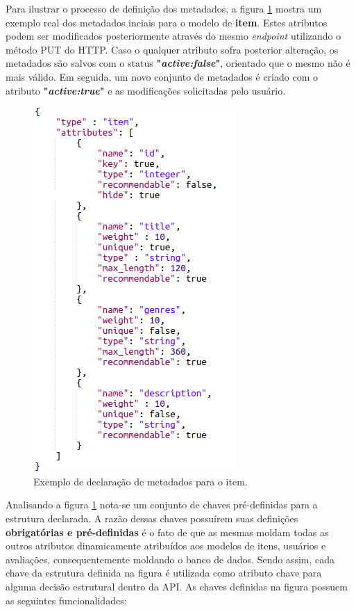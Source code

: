 Para ilustrar o processo de definição dos metadados, a figura \ref{metadata} mostra um exemplo real dos metadados inciais para o modelo de \textbf{item}. Estes atributos podem ser modificados posteriormente através do mesmo \textit{endpoint} utilizando o método PUT do HTTP. Caso o qualquer atributo sofra posterior alteração, os metadados são salvos com o status \textbf{"\textit{active:false}"}, orientado que o mesmo não é mais válido. Em seguida, um novo conjunto de metadados é criado com o atributo \textbf{"\textit{active:true}"} e as modificações solicitadas pelo usuário.

\begin{figure}[htp]
	\caption{\label{metadata}Exemplo de declaração de metadados para o item.}
	\begin{center}
		\includegraphics[scale=0.8]{images/metadata.png}
	\end{center}
	\hspace{5.5cm}{Fonte: O Autor.}
\end{figure}

Analisando a figura \ref{metadata} nota-se um conjunto de chaves pré-definidas para a estrutura declarada. A razão dessas chaves possuírem suas definições \textbf{obrigatórias e pré-definidas} é o fato de que as mesmas moldam todas as outros atributos dinamicamente atribuídos aos modelos de itens, usuários e avaliações, consequentemente moldando o banco de dados. Sendo assim, cada chave da estrutura definida na figura é utilizada como atributo chave para alguma decisão estrutural dentro da API. As chaves definidas na figura possuem as seguintes funcionalidades:


